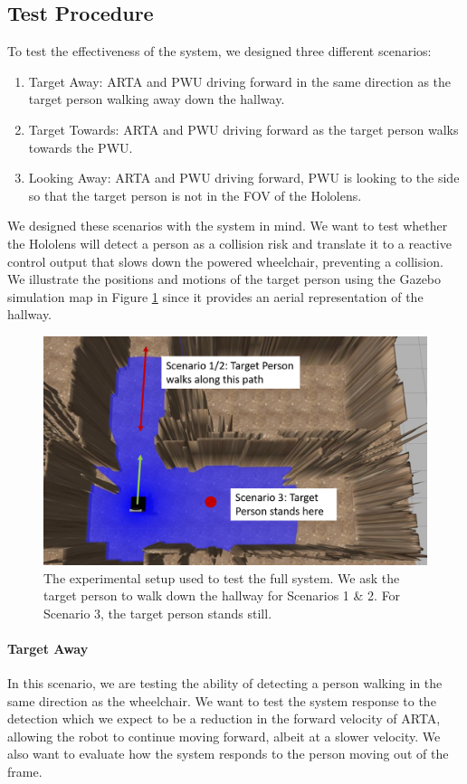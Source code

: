 \subsection{Test Procedure}
To test the effectiveness of the system, we designed three different scenarios:

\begin{enumerate}
	\item Target Away: ARTA and PWU driving forward in the same direction as the target person walking away down the hallway.
	\item Target Towards: ARTA and PWU driving forward as the target person walks towards the PWU.
	\item Looking Away: ARTA and PWU driving forward, PWU is looking to the side so that the target person is not in the FOV of the Hololens.
\end{enumerate}

We designed these scenarios with the system in mind. We want to test whether the Hololens will detect a person as a collision risk and translate it to a reactive control output that slows down the powered wheelchair, preventing a collision. We illustrate the positions and motions of the target person using the Gazebo simulation map in Figure \ref{fig:fullSystemTest} since it provides an aerial representation of the hallway.

\begin{figure}[ht]
	\centering
	\includegraphics[width=0.9\linewidth]{img/chapter6_test/fullSystem.png}
	\caption{The experimental setup used to test the full system. We ask the target person to walk down the hallway for Scenarios 1 \& 2. For Scenario 3, the target person stands still.}
	\label{fig:fullSystemTest}
\end{figure}

\paragraph{Target Away} In this scenario, we are testing the ability of detecting a person walking in the same direction as the wheelchair. We want to test the system response to the detection which we expect to be a reduction in the forward velocity of ARTA, allowing the robot to continue moving forward, albeit at a slower velocity. We also want to evaluate how the system responds to the person moving out of the frame.

